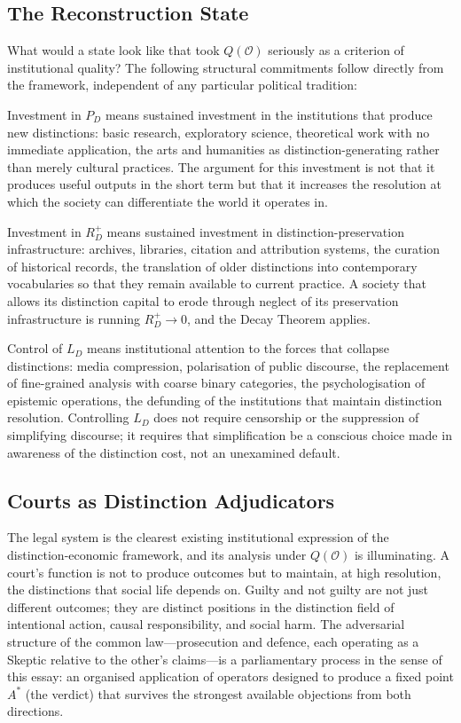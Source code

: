 \documentclass[12pt, letterpaper]{article}
\theoremstyle{remark}
\begin{document}
\subsection{The Reconstruction State}

What would a state look like that took $Q(\mathcal{O})$ seriously as a
criterion of institutional quality?  The following structural commitments
follow directly from the framework, independent of any particular political
tradition:

Investment in $P_D$ means sustained investment in the institutions that
produce new distinctions: basic research, exploratory science, theoretical
work with no immediate application, the arts and humanities as
distinction-generating rather than merely cultural practices.  The argument
for this investment is not that it produces useful outputs in the short term
but that it increases the resolution at which the society can differentiate
the world it operates in.

Investment in $R_D^{+}$ means sustained investment in distinction-preservation
infrastructure: archives, libraries, citation and attribution systems, the
curation of historical records, the translation of older distinctions into
contemporary vocabularies so that they remain available to current practice.
A society that allows its distinction capital to erode through neglect of
its preservation infrastructure is running $R_D^{+} \to 0$, and the Decay
Theorem applies.

Control of $L_D$ means institutional attention to the forces that collapse
distinctions: media compression, polarisation of public discourse, the
replacement of fine-grained analysis with coarse binary categories, the
psychologisation of epistemic operations, the defunding of the institutions
that maintain distinction resolution.  Controlling $L_D$ does not require
censorship or the suppression of simplifying discourse; it requires that
simplification be a conscious choice made in awareness of the distinction
cost, not an unexamined default.

\subsection{Courts as Distinction Adjudicators}

The legal system is the clearest existing institutional expression of the
distinction-economic framework, and its analysis under $Q(\mathcal{O})$
is illuminating.  A court's function is not to produce outcomes but to
maintain, at high resolution, the distinctions that social life depends on.
Guilty and not guilty are not just different outcomes; they are distinct
positions in the distinction field of intentional action, causal responsibility,
and social harm.  The adversarial structure of the common law---prosecution
and defence, each operating as a Skeptic relative to the other's claims---is
a parliamentary process in the sense of this essay: an organised application
of operators designed to produce a fixed point $A^*$ (the verdict) that
survives the strongest available objections from both directions.
\end{document}

